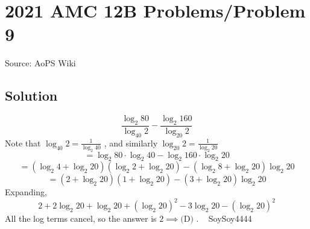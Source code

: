 \documentclass[12pt]{article}
\begin{document}
\section*{{2021 AMC 12B Problems/Problem 9}}
Source: AoPS Wiki

\subsection*{Solution}
\[\frac{\log_{2}{80}}{\log_{40}{2}}-\frac{\log_{2}{160}}{\log_{20}{2}}\] Note that $\log_{40}{2}=\frac{1}{\log_{2}{40}}$ , and similarly $\log_{20}{2}=\frac{1}{\log_{2}{20}}$ \[= \log_{2}{80}\cdot \log_{2}{40}-\log_{2}{160}\cdot \log_{2}{20}\] \[=(\log_{2}{4}+\log_{2}{20})(\log_{2}{2}+\log_{2}{20})-(\log_{2}{8}+\log_{2}{20})\log_{2}{20}\] \[=(2+\log_{2}{20})(1+\log_{2}{20})-(3+\log_{2}{20})\log_{2}{20}\] Expanding, \[2+2\log_{2}{20}+\log_{2}{20}+(\log_{2}{20})^2-3\log_{2}{20}-(\log_{2}{20})^2\] All the log terms cancel, so the answer is $2\implies\boxed{\text{(D)}}$ . ~ SoySoy4444
\end{document}
